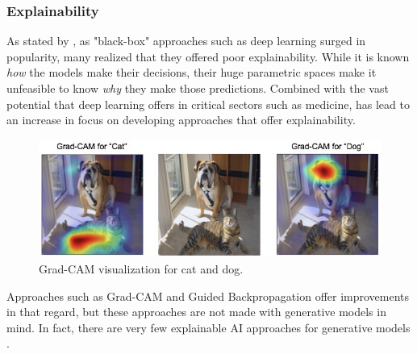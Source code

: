\subsubsection{Explainability}
As stated by \textcite{XAI}, as "black-box" approaches such as deep learning surged in popularity, many realized that they offered poor explainability. While it is known \textit{how} the models make their decisions, their huge parametric spaces make it unfeasible to know \textit{why} they make those predictions. Combined with the vast potential that deep learning offers in critical sectors such as medicine, has lead to an increase in focus on developing approaches that offer explainability.
\begin{figure}[H]
    \centering
    \includegraphics[width=\linewidth]{resources/related_works/gradcam.jpg}
    \caption{Grad-CAM visualization for cat and dog.}
\end{figure}
Approaches such as Grad-CAM \cite{GradCam} and Guided Backpropagation \cite{guided_backprop} offer improvements in that regard, but these approaches are not made with generative models in mind. In fact, there are very few explainable AI approaches for generative models \cite{XAI}.
